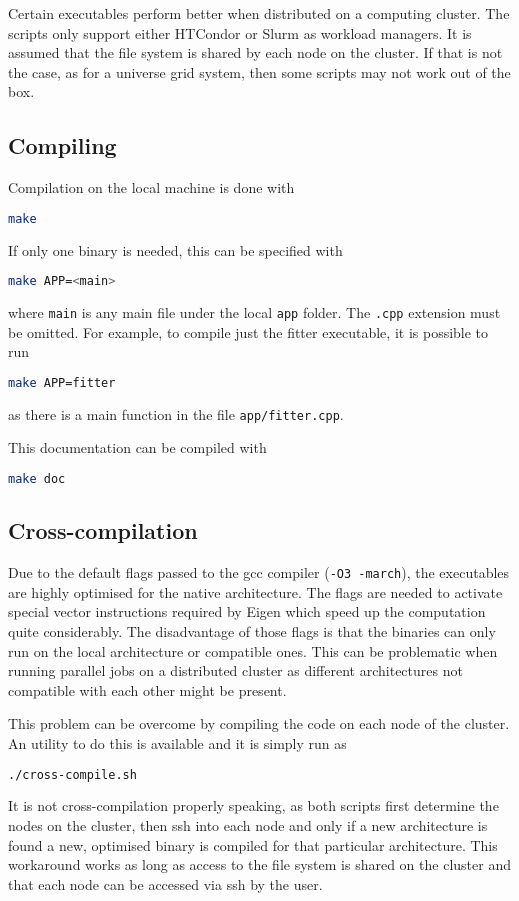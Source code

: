 \documentclass[a4paper, 11pt]{article}
\begin{document}
Certain executables perform better when distributed on a computing cluster.
The scripts only support either HTCondor or Slurm as workload managers.
It is assumed that the file system is shared by each node on the cluster.
If that is not the case, as for a universe grid system, then some scripts may not work out of the box.

\subsection{Compiling}

Compilation on the local machine is done with
\begin{lstlisting}[language=bash]
	make
\end{lstlisting}
If only one binary is needed, this can be specified with
\begin{lstlisting}[language=bash]
	make APP=<main>
\end{lstlisting}
where \texttt{main} is any main file under the local \texttt{app} folder.
The \texttt{.cpp} extension must be omitted.
For example, to compile just the fitter executable, it is possible to run
\begin{lstlisting}[language=bash]
	make APP=fitter
\end{lstlisting}
as there is a main function in the file \texttt{app/fitter.cpp}.

This documentation can be compiled with
\begin{lstlisting}[language=bash]
	make doc
\end{lstlisting}

\subsection{Cross-compilation}

Due to the default flags passed to the gcc compiler (\texttt{-O3 -march}), the executables are highly optimised %
for the native architecture.
The flags are needed to activate special vector instructions required by Eigen which speed up %
the computation quite considerably.
The disadvantage of those flags is that the binaries can only run on the local architecture or compatible ones.
This can be problematic when running parallel jobs on a distributed cluster as different architectures %
not compatible with each other might be present.

This problem can be overcome by compiling the code on each node of the cluster.
An utility to do this is available and it is simply run as
\begin{lstlisting}[language=bash]
	./cross-compile.sh
\end{lstlisting}
It is not cross-compilation properly speaking, as both scripts first determine the nodes %
on the cluster, then ssh into each node and only if a new architecture is found a new, optimised binary is compiled %
for that particular architecture.
This workaround works as long as access to the file system is shared on the cluster and that each node can %
be accessed via ssh by the user.
\end{document}
